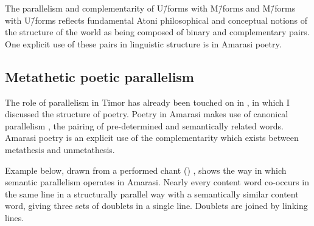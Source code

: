 \begin{exe}
	\vspace{4pt}\label{ex:120923-2, 1.39 ch:ConCon}
	\label{ex:130909-6, 0.36 ch:ConCon}
\end{exe}

The parallelism and complementarity of U\=/forms with M\=/forms
and M\=/forms with U\=/forms reflects fundamental Atoni philosophical
and conceptual notions of the structure of the world
as being composed of binary and complementary pairs.
One explicit use of these pairs in linguistic structure is in Amarasi poetry.

\subsection{Metathetic poetic parallelism}\label{sec:MetPoePar}
The role of parallelism in Timor has already been touched on
in , in which I discussed the structure of poetry.
Poetry in Amarasi makes use of canonical parallelism \citep{fo88,fo14},
the pairing of pre-determined and semantically related words.
Amarasi poetry is an explicit use of the complementarity
which exists between metathesis and unmetathesis.

Example  below,
drawn from a performed chant () ,
shows the way in which semantic parallelism operates in Amarasi.
Nearly every content word co-occurs in the same line in a structurally
parallel way with a semantically similar content word,
giving three sets of doublets in a single line.
Doublets are joined by linking lines.

